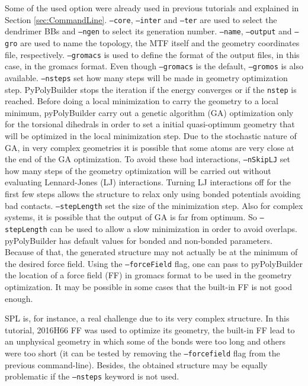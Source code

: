 Some of the used option were already used in previous tutorials and explained in Section \ref{sec:CommandLine}.
\texttt{--core}, \texttt{--inter} and \texttt{--ter} are used to select the dendrimer BBs and \texttt{--ngen} to select its generation number.
\texttt{--name}, \texttt{--output} and \texttt{--gro} are used to name the topology, the MTF itself and the geometry coordinates file, respectively.
\texttt{--gromacs} is used to define the format of the output files, in this case, in the gromacs format.
Even though \texttt{--gromacs} is the default, \texttt{--gromos} is also available.
\texttt{--nsteps} set how many steps will be made in geometry optimization step.
PyPolyBuilder stops the iteration if the energy converges or if the \texttt{nstep} is reached.
Before doing a local minimization to carry the geometry to a local minimum, pyPolyBuilder carry out a genetic algorithm (GA) optimization only for the torsional dihedrals in order to set a initial quasi-optimum geometry that will be optimized in the local minimization step.
Due to the stochastic nature of GA, in very complex geometries it is possible that some atoms are very close at the end of the GA optimization.
To avoid these bad interactions, \texttt{--nSkipLJ} set how many steps of the geometry optimization will be carried out without evaluating Lennard-Jones (LJ) interactions.
Turning LJ interactions off for the first few steps allows the structure to relax only using bonded potentials avoiding bad contacts.
\texttt{--stepLength} set the size of the minimization step.
Also for complex systems, it is possible that the output of GA is far from optimum.
So \texttt{--stepLength} can be used to allow a slow minimization in order to avoid overlaps.
pyPolyBuilder has default values for bonded and non-bonded parameters.
Because of that, the generated structure may not actually be at the minimum of the desired force field.
Using the \texttt{--forceField} flag, one can pass to pyPolyBuilder the location of a force field (FF) in gromacs format to be used in the geometry optimization. 
It may be possible in some cases that the built-in FF is not good enough.

SPL is, for instance, a real challenge due to its very complex structure.
In this tutorial, 2016H66 FF was used to optimize its geometry, the built-in FF lead to an unphysical geometry in which some of the bonds were too long and others were too short (it can be tested by removing the \texttt{--forcefield} flag from the previous command-line).
Besides, the obtained structure may be equally problematic if the \texttt{--nsteps} keyword is not used.

